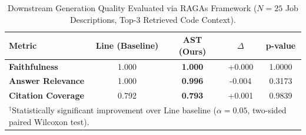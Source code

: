 \begin{table}[t]
\centering
\small
\caption{Downstream Generation Quality Evaluated via RAGAs Framework ($N=25$ Job Descriptions, Top-3 Retrieved Code Context).}
\label{tab:ragas_generation}
\begin{tabular}{lcccc}
\toprule
\textbf{Metric} & \textbf{Line (Baseline)} & \textbf{AST (Ours)} & $\Delta$ & \textbf{p-value} \\
\midrule
\textbf{Faithfulness} & 1.000 & \textbf{1.000} & +0.000 & 1.0000 \\
\textbf{Answer Relevance} & 1.000 & \textbf{0.996} & -0.004 & 0.3173 \\
\textbf{Citation Coverage} & 0.792 & \textbf{0.793} & +0.001 & 0.9839 \\
\bottomrule
\multicolumn{5}{l}{\footnotesize $^{\dagger}$Statistically significant improvement over Line baseline ($\alpha = 0.05$, two-sided paired Wilcoxon test).} \\
\end{tabular}
\vspace{-2mm}
\end{table}